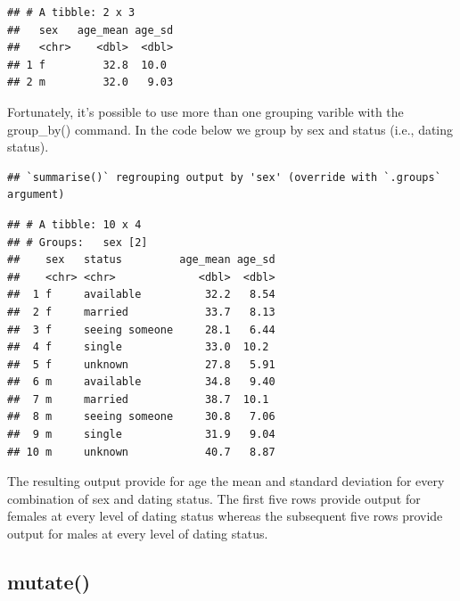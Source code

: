 \documentclass[
]{krantz}
\makeatletter
\newenvironment{Shaded}{\begin{snugshade}}{\end{snugshade}}
\newcommand{\DataTypeTok}[1]{\textcolor[rgb]{0.27,0.27,0.27}{#1}}
\newcommand{\KeywordTok}[1]{\textcolor[rgb]{0.27,0.27,0.27}{\textbf{#1}}}
\newcommand{\NormalTok}[1]{#1}
\newcommand{\OperatorTok}[1]{\textcolor[rgb]{0.43,0.43,0.43}{\textbf{#1}}}
\newcommand{\OtherTok}[1]{\textcolor[rgb]{0.37,0.37,0.37}{#1}}
\newcommand{\StringTok}[1]{\textcolor[rgb]{0.5,0.5,0.5}{#1}}
\newenvironment{kframe}{%
\medskip{}
\setlength{\fboxsep}{.8em}
 \def\at@end@of@kframe{}%
 \ifinner\ifhmode%
  \def\at@end@of@kframe{\end{minipage}}%
  \begin{minipage}{\columnwidth}%
 \fi\fi%
 \def\FrameCommand##1{\hskip\@totalleftmargin \hskip-\fboxsep
 \colorbox{shadecolor}{##1}\hskip-\fboxsep
     \hskip-\linewidth \hskip-\@totalleftmargin \hskip\columnwidth}%
 \MakeFramed {\advance\hsize-\width
   \@totalleftmargin\z@ \linewidth\hsize
   \@setminipage}}%
 {\par\unskip\endMakeFramed%
 \at@end@of@kframe}
\renewenvironment{Shaded}{\begin{kframe}}{\end{kframe}}
\makeatother
\begin{document}
\begin{verbatim}
## # A tibble: 2 x 3
##   sex   age_mean age_sd
##   <chr>    <dbl>  <dbl>
## 1 f         32.8  10.0 
## 2 m         32.0   9.03
\end{verbatim}

Fortunately, it's possible to use more than one grouping varible with the group\_by() command. In the code below we group by sex and status (i.e., dating status).

\begin{Shaded}
\end{Shaded}

\begin{verbatim}
## `summarise()` regrouping output by 'sex' (override with `.groups` argument)
\end{verbatim}

\begin{verbatim}
## # A tibble: 10 x 4
## # Groups:   sex [2]
##    sex   status         age_mean age_sd
##    <chr> <chr>             <dbl>  <dbl>
##  1 f     available          32.2   8.54
##  2 f     married            33.7   8.13
##  3 f     seeing someone     28.1   6.44
##  4 f     single             33.0  10.2 
##  5 f     unknown            27.8   5.91
##  6 m     available          34.8   9.40
##  7 m     married            38.7  10.1 
##  8 m     seeing someone     30.8   7.06
##  9 m     single             31.9   9.04
## 10 m     unknown            40.7   8.87
\end{verbatim}

The resulting output provide for age the mean and standard deviation for every combination of sex and dating status. The first five rows provide output for females at every level of dating status whereas the subsequent five rows provide output for males at every level of dating status.

\hypertarget{mutate}{%
\subsection{mutate()}\label{mutate}}
\end{document}
